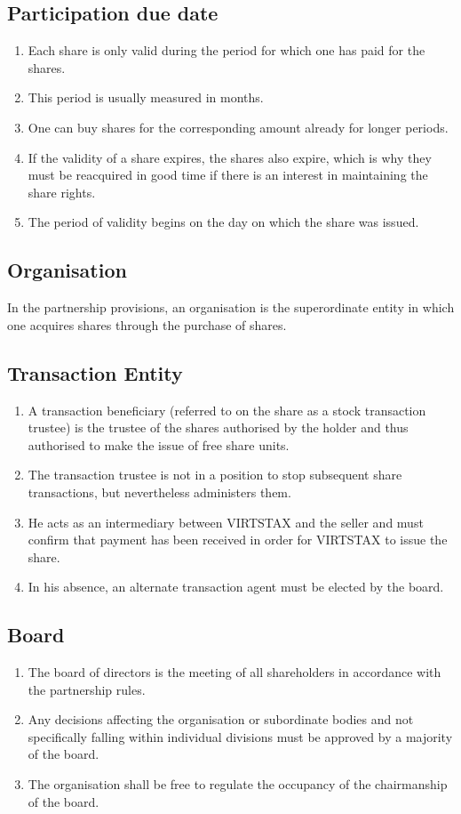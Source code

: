 \documentclass{article}
\begin{document}
\subsection{Participation due date}
\begin{enumerate}[(1)]
	\item Each share is only valid during the period for which one has paid for the shares.
	\item This period is usually measured in months.
	\item One can buy shares for the corresponding amount already for longer periods.
	\item If the validity of a share expires, the shares also expire, which is why they must be reacquired in good time if there is an interest in maintaining the share rights.
	\item The period of validity begins on the day on which the share was issued.
\end{enumerate}

\subsection{Organisation}
In the partnership provisions, an organisation is the superordinate entity in which one acquires shares through the purchase of shares.

\subsection{Transaction Entity}
\begin{enumerate}[(1)]
	\item A transaction beneficiary (referred to on the share as a stock transaction trustee) is the trustee of the shares authorised by the holder and thus authorised to make the issue of free share units.
	\item The transaction trustee is not in a position to stop subsequent share transactions, but nevertheless administers them.
	\item He acts as an intermediary between VIRTSTAX and the seller and must confirm that payment has been received in order for VIRTSTAX to issue the share.
	\item In his absence, an alternate transaction agent must be elected by the board.
\end{enumerate}

\subsection{Board}
\begin{enumerate}[(1)]
	\item The board of directors is the meeting of all shareholders in accordance with the partnership rules.
	\item Any decisions affecting the organisation or subordinate bodies and not specifically falling within individual divisions must be approved by a majority of the board.
	\item The organisation shall be free to regulate the occupancy of the chairmanship of the board.
\end{enumerate}
\end{document}
